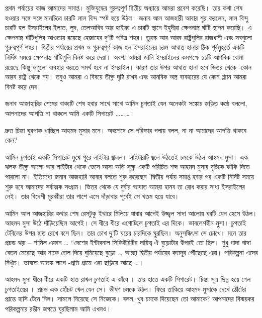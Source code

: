 \documentclass[
]{book}
\begin{document}
প্রথম পর্যায়ের কাজ আমাদের সমাপ্ত। মুক্তিযুদ্ধের গুরুত্বপূর্ণ দ্বিতীয় অধ্যায়ে আমরা প্রবেশ করেছি। তার কথা শেষ হওয়ার সঙ্গে সঙ্গে মানচিত্রে চারটি লাল বিন্দ স্পষ্ট হয়ে উঠল। জনাব আল আজহারী আবার শুর করলেন, লাল বিন্দু চারটি হল ইসরাইলের ইলাত, লুদ, তেলআবিব আর হাইফা এ চারটি স্থানে ইহুদীরা ক্ষেপনাস্ত্র ঘাঁটি স্থাপন করেছি। এ ক্ষেপনাস্ত্র ঘাঁটিগুলির আওতায় রয়েছে হেজাযের দু'টি পবিত্র শহর। তুরস্ক আর আরব রাষ্ট্রগুলির রাজধানী এবং সবগুলো গুরুত্বপূর্ণ শহর। দ্বিতীয় পর্যায়ের প্রথম ও গুরুত্বপূর্ণ কাজ হল ইসরাইলের চরম আঘাত হানার ঠিক পূর্বমুহূর্তে একটি নির্দিষ্ট সময়ে ক্ষেপনাস্ত্র ঘাঁটিগুলি বিনষ্ট করে দেয়া। অবশ্য আমরা জানি ইসরাইলের কমপক্ষে ১১টি আণবিক বোমা রয়েছে কিন্তু ওগুলো ব্যবহার করতে সমর্থ হবে না ইসরাইল। কারণ তার উপর আঘাত হানা হবে ভিতর থেকে -কোন আরব রাষ্ট্র থেকে নয়। তবুও আমরা এ বিষয়ে তীক্ষ্ণ দৃষ্টি রাখব এবং আনবিক অস্ত্র ব্যবহারের যে কোন প্ল্যান আমরা বিনষ্ট করে দেব।

জনাব আজাহারির শেষের বাক্যটি শেষ হবার সাথে সাথে আমিন চুগতাই যেন অনেকটা সঙ্কোচ জড়িত কন্ঠে বললো, আপনাদের আপত্তি না থাকলে আমি একটি সিগারেট \ldots\ldots\ldots।

দ্রুত চিন্তা ঘুরপাক খাচ্ছিল আহমদ মুসার মনে। অবশেষে সে পরিস্কার গলায় বলল, না না আমাদের আপত্তি থাকবে কেন?

আমিন চুগতাই একটি সিগারেট মুখে পুরে লাইটার জ্বালল। লাইটারটি জ্বলে উঠতেই চমকে উঠল আহমদ মুসা। এক ঝলক তীক্ষ্ণ আলো আর লাইটার থেকে ভেসে আসা অতি সুক্ষ্ণ একটি পরিচিত শব্দ আহমদ মুসার দৃষ্টিকে ফাঁকি দিতে পারলো না। ইতিমধ্যে জনাব আজহারি আবার বলতে শুরু করেছেন 'দ্বিতীয় পর্যায় সমাপ্ত হবার পর একটি নির্দিষ্ট সময়ে শুরু হবে আমাদের সর্বাত্মক সংগ্রাম। ভিতর থেকে যে দুর্বার আঘাত আমরা হানব তা রোধ করার সাধ্য ইসরাইলের নেই। তার বিদেশী মুরব্বীরা তার পাশে এসে দাঁড়াবার পূর্বেই সে খতম হয়ে যাবে।

আমিন আল আজহারির কথার শেষ রেসটুকু ইথারে মিলিয়ে যাবার আগেই উজ্জ্বল সাদা আলোয় ঘরটি যেন হেসে উঠল। আহমদ মুসা উঠে দাঁড়িয়েছিল আগেই। সে ধীরে ধীরে এগোচ্ছিল চুগতাই এর দিকে। ভাবলেশহীন মুসা। চুগতাই টেবিলের উপর হাত রেখে বসে ছিল। তার চোখ দু'টি ঘরের চারদিকে ঘুরছিল। অনুসন্ধিৎসা সে চোখে। মনে তার প্রচন্ড ঝড় -- শামিল এফান \ldots{} ``দেশের ইন্টারনাল সিকিউরিটির দায়িত্ব ঐ বুড়োটার উপরই তো ছিল। শুধু গাদা গাদা বেতন মেরেছে আর নাকে তেল দিয়ে ঘুমিয়েছে বুড়ো \ldots{} আচ্ছা দ্বিতীয় পর্যায়ের কতদূর পৌঁছেছে এরা। পরিকল্পনা এদের নিখুঁত। ভাবতে আতঙ্ক লাগে -প্রতি গ্রামে এরা ছড়িয়ে আছে \ldots।

আহমদ মুসা ধীরে ধীরে একটি হাত রাখল চুগতাই এ কাঁধে । তার হাতে একটি সিগারেট। চিন্তা সূত্র ছিন্ন হয়ে গেল চুগতাইয়ের । প্রচন্ড এক হোঁচট খেল যেন সে। ভীষণ চমকে উঠল। ফিরে তাকিয়ে আহমদ মুসাকে দেখে ঠোঁটের প্রান্তে হাসি টেনে নিল। সামলে নিয়েছে সে নিজেকে। বলল, খুব চমকে দিয়েছেন তো আমাকে? আপনাদের বিস্ময়কর পরিকল্পনার রঙীন জগতে ঘুরছিলাম আমি এখনও।
\end{document}

